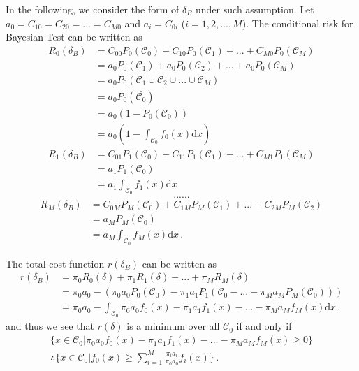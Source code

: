 In the following, we consider the form of $\delta_B$ under such assumption.
Let $a_0 = C_{10} = C_{20} = ... = C_{M0}$ and $a_i = C_{0i}$ ($i= 1, 2, ..., M$).
The conditional risk for Bayesian Test can be written as 
\begin{equation}
\begin{split}
R_0(\delta_B) &= C_{00}P_0(\mathcal{C}_0) + C_{10}P_0(\mathcal{C}_1) + ... +  C_{M0}P_0(\mathcal{C}_M)\\
&= a_0P_0(\mathcal{C}_1) + a_0P_0(\mathcal{C}_2) + ... + a_0P_0(\mathcal{C}_M)\\
&= a_0P_0(\mathcal{C}_1\cup \mathcal{C}_2 \cup ... \cup \mathcal{C}_M)\\
&= a_0P_0(\bar{\mathcal{C}_0})\\
&= a_0(1 - P_0(\mathcal{C}_0))\\
&= a_0(1 - \int_{\mathcal{C}_0}f_0(x)\mathrm{d}x)
\end{split}
\end{equation}
\begin{equation}
\begin{split}
R_1(\delta_B) &= C_{01}P_1(\mathcal{C}_0) + C_{11}P_1(\mathcal{C}_1) + ... +  C_{M1}P_1(\mathcal{C}_M)\\  
&= a_1P_1(\mathcal{C}_0)\\
&= a_1\int_{\mathcal{C}_0}f_1(x)\mathrm{d}x
\end{split}
\end{equation}
\[
......
\]
\begin{equation}
\begin{split}
R_M(\delta_B) &= C_{0M}P_M(\mathcal{C}_0) + C_{1M}P_M(\mathcal{C}_1) + ... +  C_{2M}P_M(\mathcal{C}_2)\\
&= a_MP_M(\mathcal{C}_0)\\
&= a_M\int_{\mathcal{C}_0}f_{M}(x)\mathrm{d}x\,.
\end{split}
\end{equation}

The total cost function $r(\delta_B)$ can be written as 
\begin{equation}
\begin{split}
\label{r00}
r(\delta_B) &= \pi_0 R_0(\delta) + \pi_1R_1(\delta) + ... +  \pi_MR_M(\delta)\\
&= \pi_0a_0 - (\pi_0a_0P_0(\mathcal{C}_0) - \pi_1a_1P_1(\mathcal{C}_0 - ... - \pi_Ma_MP_M(\mathcal{C}_0)))\\
&= \pi_0a_0 - \int_{\mathcal{C}_0}\pi_0a_0f_0(x) - \pi_1a_1f_1(x) - ... - \pi_Ma_Mf_M(x) \mathrm{d}x\,. 
\end{split}
\end{equation}
and thus we see that $r(\delta)$ is a minimum over all $\mathcal{C}_0$ if and only if 
\begin{equation}
\begin{split}
\label{equ: C}
 \{ x\in \mathcal{C}_0 | \pi_0a_0f_0(x) - \pi_1a_1f_1(x) - ... - \pi_Ma_Mf_M(x) \geq 0\}\\
 \therefore \{ x\in \mathcal{C}_0 | f_0(x) \geq \sum_{i=1}^{M}\frac{\pi_ia_i}{\pi_0a_0}f_i(x) \}\,.
\end{split}
\end{equation}

